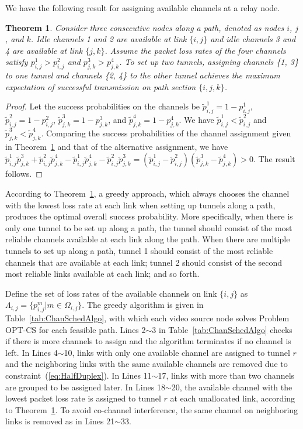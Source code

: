 \documentclass[12pt,onecolumn,draftclsnofoot]{IEEEtran} %
\newtheorem{theorem}{Theorem}
\begin{document}
We have the following result for assigning available channels at a relay node. 

\smallskip
\begin{theorem} \label{th:th1}
Consider three consecutive nodes along a path, denoted as nodes $i$, $j$, and $k$.  Idle channels 1 and 2 are available at link $\{i, j\}$ and idle channels 3 and 4 are available at link $\{j, k\}$.  Assume the packet loss rates of the four channels satisfy $p_{i,j}^1 > p_{i,j}^2$ and $p_{j,k}^3 > p_{j,k}^4$.  To set up two tunnels, assigning channels \{1, 3\} to one tunnel and channels \{2, 4\} to the other tunnel achieves the maximum expectation of successful transmission on path section $\{i, j, k\}$.
\end{theorem}
%
\begin{proof}
Let the success probabilities on the channels be $\tilde{p}_{i,j}^1=1-p_{i,j}^1$, $\tilde{p}_{i,j}^2=1-p_{i,j}^2$, $\tilde{p}_{j,k}^3=1-p_{j,k}^3$, and $\tilde{p}_{j,k}^4=1-p_{j,k}^4$.  We have $\tilde{p}_{i,j}^1 < \tilde{p}_{i,j}^2$ and $\tilde{p}_{j,k}^3<\tilde{p}_{j,k}^4$. 
Comparing the success probabilities of the channel assignment given in Theorem~\ref{th:th1} and that of the alternative assignment, we have
$\tilde{p}_{i,j}^1 \tilde{p}_{j,k}^3 + \tilde{p}_{i,j}^2 \tilde{p}_{j,k}^4 -
	 \tilde{p}_{i,j}^1 \tilde{p}_{j,k}^4 - \tilde{p}_{i,j}^2 \tilde{p}_{j,k}^3 
=(\tilde{p}_{i,j}^1-\tilde{p}_{i,j}^2)(\tilde{p}_{j,k}^3-\tilde{p}_{j,k}^4) > 0$.
The result follows.
\end{proof}
\smallskip

According to Theorem~\ref{th:th1}, a greedy approach, which always chooses the channel with the lowest loss rate at each link when setting up tunnels along a path, produces the optimal overall success probability.  More specifically, when there is only one tunnel to be set up along a path, the tunnel should consist of the most reliable channels available at each link along the path.  When there are multiple tunnels to set up along a path, tunnel 1 should consist of the most reliable channels that are available at each link; tunnel 2 should consist of the second most reliable links available at each link; and so forth. 
 
Define the set of loss rates of the available channels on link $\{i, j\}$ as $\Lambda_{i,j}=\{p_{i,j}^m|m \in \Omega_{i,j} \}$.  The greedy algorithm is given in Table~\ref{tab:ChanSchedAlgo}, with which each video source node solves Problem OPT-CS for each feasible path.  Lines 2$\sim$3 in Table~\ref{tab:ChanSchedAlgo} checks if there is more channels to assign and the algorithm terminates if no channel is left.  In Lines 4$\sim$10, links with only one available channel are assigned to tunnel $r$ and the neighboring links with the same available channels are removed due to constraint~(\ref{eq:HalfDuplex}).  In Lines 11$\sim$17, links with more than two channels are grouped to be assigned later.  In Lines 18$\sim$20, the available channel with the lowest packet loss rate is assigned to tunnel $r$ at each unallocated link, according to Theorem~\ref{th:th1}.  To avoid co-channel interference, the same channel on neighboring links is removed as in Lines 21$\sim$33.
\end{document}
